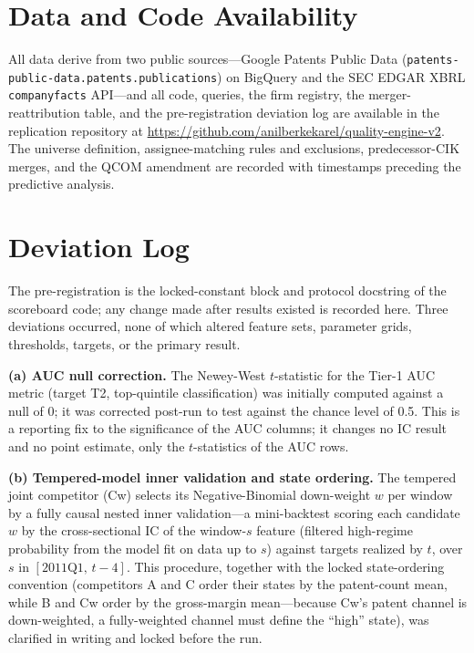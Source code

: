 \documentclass[11pt]{article}
\begin{document}



\appendix
\renewcommand{\thesection}{Appendix~\Alph{section}:}

\section{Data and Code Availability}

All data derive from two public sources---Google Patents Public Data (\texttt{patents-\allowbreak public-\allowbreak data.\allowbreak patents.\allowbreak publications}) on BigQuery and the SEC EDGAR XBRL \texttt{companyfacts} API---and all code, queries, the firm registry, the merger-reattribution table, and the pre-registration deviation log are available in the replication repository at \url{https://github.com/anilberkekarel/quality-engine-v2}. The universe definition, assignee-matching rules and exclusions, predecessor-CIK merges, and the QCOM amendment are recorded with timestamps preceding the predictive analysis.

\section{Deviation Log}

The pre-registration is the locked-constant block and protocol docstring of the scoreboard code; any change made after results existed is recorded here. Three deviations occurred, none of which altered feature sets, parameter grids, thresholds, targets, or the primary result.

\textbf{(a) AUC null correction.} The Newey-West $t$-statistic for the Tier-1 AUC metric (target T2, top-quintile classification) was initially computed against a null of 0; it was corrected post-run to test against the chance level of 0.5. This is a reporting fix to the significance of the AUC columns; it changes no IC result and no point estimate, only the $t$-statistics of the AUC rows.

\textbf{(b) Tempered-model inner validation and state ordering.} The tempered joint competitor (Cw) selects its Negative-Binomial down-weight $w$ per window by a fully causal nested inner validation---a mini-backtest scoring each candidate $w$ by the cross-sectional IC of the window-$s$ feature (filtered high-regime probability from the model fit on data up to $s$) against targets realized by $t$, over $s$ in $[\text{2011Q1},\, t-4]$. This procedure, together with the locked state-ordering convention (competitors A and C order their states by the patent-count mean, while B and Cw order by the gross-margin mean---because Cw's patent channel is down-weighted, a fully-weighted channel must define the ``high'' state), was clarified in writing and locked before the run.
\end{document}

